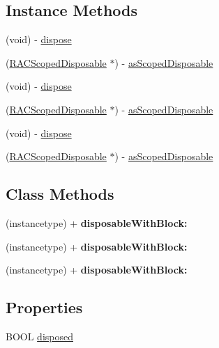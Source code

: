 \subsection*{Instance Methods}
\begin{DoxyCompactItemize}
\item 
(void) -\/ \mbox{\hyperlink{interface_r_a_c_disposable_a3158dc03efcf49e7a5174acc6e3711d5}{dispose}}
\item 
(\mbox{\hyperlink{interface_r_a_c_scoped_disposable}{R\+A\+C\+Scoped\+Disposable}} $\ast$) -\/ \mbox{\hyperlink{interface_r_a_c_disposable_a44a30ba7bac71901227b8a6eadaa23f5}{as\+Scoped\+Disposable}}
\item 
(void) -\/ \mbox{\hyperlink{interface_r_a_c_disposable_a3158dc03efcf49e7a5174acc6e3711d5}{dispose}}
\item 
(\mbox{\hyperlink{interface_r_a_c_scoped_disposable}{R\+A\+C\+Scoped\+Disposable}} $\ast$) -\/ \mbox{\hyperlink{interface_r_a_c_disposable_a44a30ba7bac71901227b8a6eadaa23f5}{as\+Scoped\+Disposable}}
\item 
(void) -\/ \mbox{\hyperlink{interface_r_a_c_disposable_a3158dc03efcf49e7a5174acc6e3711d5}{dispose}}
\item 
(\mbox{\hyperlink{interface_r_a_c_scoped_disposable}{R\+A\+C\+Scoped\+Disposable}} $\ast$) -\/ \mbox{\hyperlink{interface_r_a_c_disposable_a44a30ba7bac71901227b8a6eadaa23f5}{as\+Scoped\+Disposable}}
\end{DoxyCompactItemize}
\subsection*{Class Methods}
\begin{DoxyCompactItemize}
\item 
\mbox{\label{interface_r_a_c_disposable_a8229f01cef312e437f091c437c0bcbed}} 
(instancetype) + {\bfseries disposable\+With\+Block\+:}
\item 
\mbox{\label{interface_r_a_c_disposable_a8229f01cef312e437f091c437c0bcbed}} 
(instancetype) + {\bfseries disposable\+With\+Block\+:}
\item 
\mbox{\label{interface_r_a_c_disposable_a8229f01cef312e437f091c437c0bcbed}} 
(instancetype) + {\bfseries disposable\+With\+Block\+:}
\end{DoxyCompactItemize}
\subsection*{Properties}
\begin{DoxyCompactItemize}
\item 
B\+O\+OL \mbox{\hyperlink{interface_r_a_c_disposable_a7d04c8119d838353c8d4e5eb45dc79f1}{disposed}}
\end{DoxyCompactItemize}


